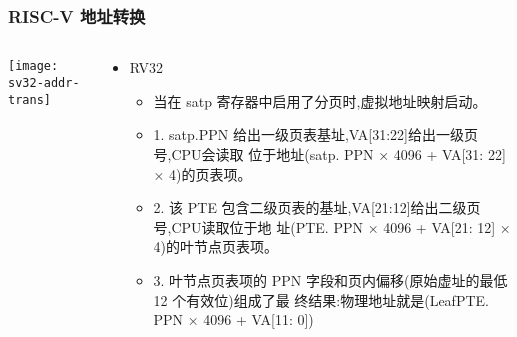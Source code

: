 \begin{frame} 
\frametitle{RISC-V 地址转换}

\begin{columns}
	
	\begin{column}{.4\textwidth}
		
		\texttt{[image: sv32-addr-trans]}
		
	\end{column}
	
	
	\begin{column}{.6\textwidth}
		
		\begin{itemize}
			\item RV32
			\begin{itemize}
				\item 当在 satp 寄存器中启用了分页时,虚拟地址映射启动。
				 \item 1. satp.PPN 给出一级页表基址,VA[31:22]给出一级页号,CPU会读取
				位于地址(satp. PPN × 4096 + VA[31: 22] × 4)的页表项。 \pause
				\item 2. 该 PTE 包含二级页表的基址,VA[21:12]给出二级页号,CPU读取位于地
				址(PTE. PPN × 4096 + VA[21: 12] × 4)的叶节点页表项。  \pause
				\item 3. 叶节点页表项的 PPN 字段和页内偏移(原始虚址的最低 12 个有效位)组成了最
				终结果:物理地址就是(LeafPTE. PPN × 4096 + VA[11: 0])
				
			\end{itemize}
		\end{itemize}
		
		
		
	\end{column}
	
	
\end{columns}
\end{frame}




